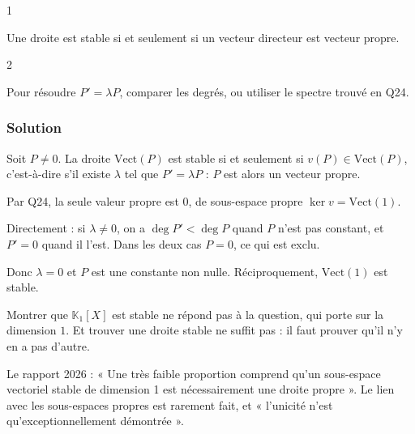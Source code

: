 \documentclass[11pt,a4paper]{article}
\newcommand{\equationajustee}[1]{%
  \sbox{\boiteequation}{$\displaystyle #1$}%
  \ifdim\wd\boiteequation>\linewidth
    \[\resizebox{\linewidth}{!}{\usebox{\boiteequation}}\]%
  \else
    \[#1\]%
  \fi}
\begin{document}
\begin{indication}{1}

Une droite est stable si et seulement si un vecteur directeur est vecteur propre.

\end{indication}

\begin{indication}{2}

Pour résoudre \(P'=\lambda P\), comparer les degrés, ou utiliser le spectre trouvé en Q24.

\end{indication}

\hypertarget{solution-24}{%
\subsubsection{Solution}\label{solution-24}}

Soit \(P\neq0\). La droite \(\mathrm{Vect}(P)\) est stable si et seulement si \(v(P)\in\mathrm{Vect}(P)\), c'est-à-dire s'il existe \(\lambda\) tel que \(P'=\lambda P\) : \(P\) est alors un vecteur propre.

Par Q24, la seule valeur propre est \(0\), de sous-espace propre \(\ker v=\mathrm{Vect}(1)\).

Directement : si \(\lambda\neq0\), on a \(\deg P'<\deg P\) quand \(P\) n'est pas constant, et \(P'=0\) quand il l'est. Dans les deux cas \(P=0\), ce qui est exclu.

Donc \(\lambda=0\) et \(P\) est une constante non nulle. Réciproquement, \(\mathrm{Vect}(1)\) est stable.

\equationajustee{\boxed{\text{Seule droite stable : }\mathrm{Vect}(1).}}

\begin{piege}

Montrer que \(\mathbb K_1[X]\) est stable ne répond pas à la question, qui porte sur la dimension \(1\). Et trouver une droite stable ne suffit pas : il faut prouver qu'il n'y en a pas d'autre.

\end{piege}

\begin{jury}

Le rapport 2026 : « Une très faible proportion comprend qu'un sous-espace vectoriel stable de dimension 1 est nécessairement une droite propre ». Le lien avec les sous-espaces propres est rarement fait, et « l'unicité n'est qu'exceptionnellement démontrée ».

\end{jury}
\end{document}
